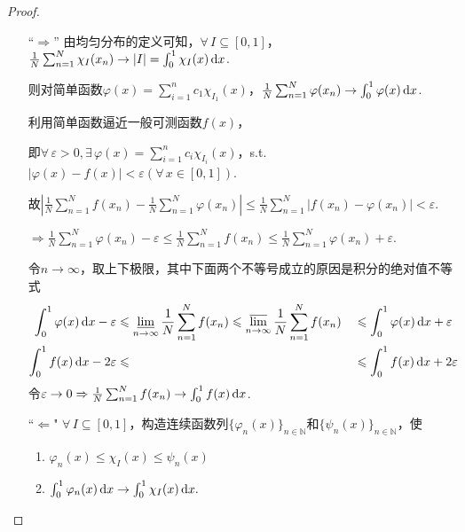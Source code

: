 \begin{proof}
    \begin{itemize}
        \item[“$\Rightarrow$”] 由均匀分布的定义可知，$\forall\, I \subseteq [0,1]$，$\frac{1}{N}\sum_{n=1}^N{\chi_{I}(x_n)} \to |I| = \int_0^1{\chi_{I}(x)}\mathop{}\!\mathrm{d} x$.\par
        则对简单函数$\varphi(x)=\sum_{i=1}^n{c_1\chi_{I_1}(x)}$，$\frac{1}{N}\sum_{n=1}^N{\varphi(x_n)}\to \int_{0}^{1}{\varphi(x)}\mathop{}\!\mathrm{d} x$.\par
        利用简单函数逼近一般可测函数$f(x)$， \par
        即$\forall\, \varepsilon>0,\exists\, \varphi(x)=\sum_{i=1}^n{c_i\chi_{I_i}(x)}$，s.t. $|\varphi(x)-f(x)| < \varepsilon(\forall\, x\in [0,1])$.\par
        故$\left\lvert \frac{1}{N}\sum_{n=1}^N{f(x_n)} - \frac{1}{N}\sum_{n=1}^N{\varphi(x_n)} \right\rvert \leqslant \frac{1}{N}\sum_{n=1}^N{\left\lvert f(x_n)-\varphi(x_n) \right\rvert} < \varepsilon$.\par
        $\Rightarrow \frac{1}{N}\sum_{n=1}^N{\varphi(x_n)} - \varepsilon \leq \frac{1}{N}\sum_{n=1}^N{f(x_n)} \leq \frac{1}{N}\sum_{n=1}^N{\varphi(x_n)} + \varepsilon$.\par
        令$n\to\infty$，取上下极限，其中下面两个不等号成立的原因是积分的绝对值不等式
        \begin{alignat*}{2}
            \int_0^1{\varphi(x)}\mathop{}\!\mathrm{d} x - \varepsilon &\leqslant \varliminf_{n\to\infty}{\frac{1}{N}\sum_{n=1}^N{f(x_n)}} \leqslant \varlimsup_{n\to\infty}{\frac{1}{N}\sum_{n=1}^N{f(x_n)}} &&\leqslant \int_0^1{\varphi(x)}\mathop{}\!\mathrm{d} x + \varepsilon  \\
            \int_0^1{f(x)}\mathop{}\!\mathrm{d} x - 2\varepsilon &\leqslant &&\leqslant \int_0^1{f(x)}\mathop{}\!\mathrm{d} x + 2\varepsilon
        \end{alignat*}
        令$\varepsilon\to 0 \Rightarrow \frac{1}{N}\sum_{n=1}^N{f(x_n)}\to \int_{0}^{1}{f(x)}\mathop{}\!\mathrm{d} x$.\par
    \end{itemize}
    \begin{minipage}[t]{0.8\textwidth}
    \begin{itemize}
        \item[“$\Leftarrow$"] $\forall\, I \subseteq [0,1]$，构造连续函数列$\{\varphi_n(x)\}_{n\in\mathbb{N}}$和$\{\psi_n(x)\}_{n\in\mathbb{N}}$，使
        \begin{enumerate}[(1)]
            \item $\varphi_n(x) \leq \chi_{I}(x) \leq \psi_n(x)$
            \item $\int_0^1{\varphi_n(x)}\mathop{}\!\mathrm{d} x \to \int_0^1{\chi_{I}(x)}\mathop{}\!\mathrm{d} x.$\par

\end{enumerate}
\end{itemize}
\end{minipage}
\end{proof}
